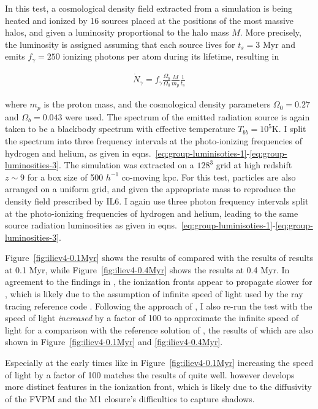 In this test, a cosmological density field extracted from a simulation is being heated and ionized
by 16 sources placed at the positions of the most massive halos, and given a luminosity
proportional to the halo mass $M$. More precisely, the luminosity is assigned assuming that each
source lives for $t_s = 3$ Myr and emits $f_\gamma = 250$ ionizing photons per atom during its
lifetime, resulting in

\begin{align}
\dot{N}_\gamma = f_\gamma \frac{\Omega_b}{\Omega_0} \frac{M}{m_p} \frac{1}{t_s}
\end{align}

where $m_p$ is the proton mass, and the cosmological density parameters $\Omega_0 = 0.27$ and
$\Omega_b = 0.043$ were used. The spectrum of the emitted radiation source is again taken to be a
blackbody spectrum with effective temperature $T_{bb} = 10^5$K. I split the spectrum into three
frequency intervals at the photo-ionizing frequencies of hydrogen and helium, as given in
eqns.~\ref{eq:group-luminisoties-1}-\ref{eq:group-luminosities-3}. The simulation was extracted on a
$128^3$ grid at high redshift $z \sim 9$ for a box size of 500 $h^{-1}$ co-moving kpc. For this test, particles are also arranged on a uniform grid, and given the appropriate mass to reproduce the density field prescribed by IL6. I again use three photon frequency intervals split at the photo-ionizing frequencies of hydrogen and helium, leading to the same source
radiation luminosities as given in eqns.~\ref{eq:group-luminisoties-1}-\ref{eq:group-luminosities-3}.

Figure~\ref{fig:iliev4-0.1Myr} shows the results of \GEARRT compared with the results of
 results at 0.1 Myr, while Figure~\ref{fig:iliev4-0.4Myr} shows the results at 0.4
Myr. In agreement to the findings in \cite{ramses-rt13}, the ionization fronts appear to propagate
slower for \GEARRT, which is likely due to the assumption of infinite speed of light used by the
ray tracing reference code . Following the approach of \cite{ramses-rt13}, I also
re-run the test with the speed of light \emph{increased} by a factor of 100 to approximate the
infinite speed of light for a comparison with the reference solution of , the
results of which are also shown in Figure~\ref{fig:iliev4-0.1Myr} and \ref{fig:iliev4-0.4Myr}.

Especially at the early times like in Figure~\ref{fig:iliev4-0.1Myr} increasing the speed of light
by a factor of 100 matches the results of  quite well.  however
develops more distinct features in the ionization front, which is likely due to the diffusivity of
the FVPM and the M1 closure's difficulties to capture shadows.

